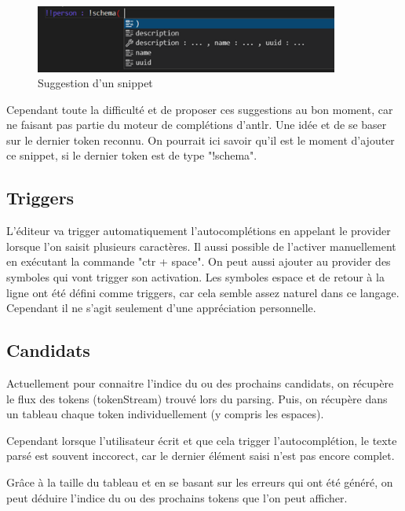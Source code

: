 \documentclass[
    iict, %
    il, %
]{heig-tb}
\begin{document}
\begin{figure}[!ht]
    \begin{center}
        \includegraphics[width=10cm]{assets/figures/snippet-suggestion.png}
    \end{center}
    \caption[Suggestion d'un snippet]{\label{snippet-suggestion} Suggestion d'un snippet}
\end{figure}

Cependant toute la difficulté et de proposer ces suggestions au bon moment, car ne faisant pas partie du moteur de complétions d'antlr. Une idée et de se baser sur le dernier token reconnu. On pourrait ici savoir qu'il est le moment d'ajouter ce snippet, si le dernier token est de type "!schema".

\subsection{Triggers}
L'éditeur va trigger automatiquement l'autocomplétions en appelant le provider lorsque l'on saisit plusieurs caractères. Il aussi possible de l'activer manuellement en exécutant la commande "ctr + space".
On peut aussi ajouter au provider des symboles qui vont trigger son activation. Les symboles espace et de retour à la ligne ont été défini comme triggers, car cela semble assez naturel dans ce langage. Cependant il ne s'agit seulement d'une appréciation personnelle.

\subsection{Candidats}\label{candidates}

Actuellement pour connaitre l'indice du ou des prochains candidats, on récupère le flux des tokens (tokenStream) trouvé lors du parsing.
Puis, on récupère dans un tableau chaque token individuellement (y compris les espaces).

Cependant lorsque l'utilisateur écrit et que cela trigger l'autocomplétion, le texte parsé est souvent inccorect, car le dernier élément saisi n'est pas encore complet.

Grâce à la taille du tableau et en se basant sur les erreurs qui ont été généré, on peut déduire l'indice du ou des prochains tokens que l'on peut afficher.
\end{document}
